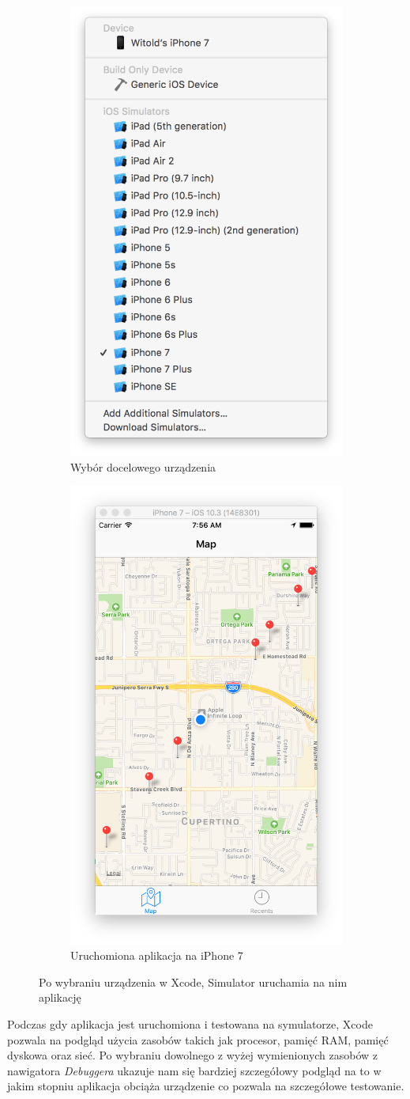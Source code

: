 \begin{figure}[ht!]
\centering
\begin{subfigure}{.5\textwidth}
  \centering
  \includegraphics[width=.4\linewidth]{images/chapter-2-image-3-target.png}
  \caption{Wybór docelowego urządzenia}
  \label{chapter-2-image-3-target}
\end{subfigure}%
\begin{subfigure}{.5\textwidth}
  \centering
  \includegraphics[width=.4\linewidth]{images/chapter-2-image-4-simulator.png}
  \caption{Uruchomiona aplikacja na iPhone 7}
  \label{chapter-2-image-4-simulator}
\end{subfigure}
\caption{Po wybraniu urządzenia w Xcode, Simulator uruchamia na nim aplikację}
\label{chapter-2-image-4-5}
\end{figure}

Podczas gdy aplikacja jest uruchomiona i testowana na symulatorze, Xcode pozwala na podgląd użycia zasobów takich jak procesor, pamięć RAM, pamięć dyskowa oraz sieć. Po wybraniu dowolnego z wyżej wymienionych zasobów z nawigatora \textit{Debuggera} ukazuje nam się bardziej szczegółowy podgląd na to w jakim stopniu aplikacja obciąża urządzenie co pozwala na szczegółowe testowanie.

